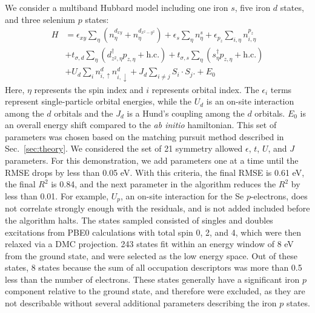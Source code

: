 We consider a multiband Hubbard model including one iron $s$, five iron $d$ states, and three selenium $p$ states:
\begin{align}
  H 
  &=
  \epsilon_{xy} \sum_{\eta} (n^{d_{xy}}_{\eta}  + n^{d_{x^2-y^2}}_{\eta})
  +
  \epsilon_s \sum_{\eta} n^{s}_{\eta} 
  +
  \epsilon_{p_{z}} \sum_{i,\eta} n^{p_{z}}_{i,\eta} 
  \nonumber \\
  &+ 
  t_{\sigma,d} \sum_{\eta} \left( d_{z^2,\eta}^{\dagger} p_{z,\eta} + \text{h.c.} \right)
  +
  t_{\sigma,s} \sum_{\eta} \left(s_{\eta}^{\dagger}  p_{z,\eta} + \text{h.c.} \right)
  \nonumber \\
  &+
  U_d \sum_{i} n^{d}_{i,\uparrow} n^{d}_{i,\downarrow} 
  +
  J_d \sum_{i\ne j} S_i \cdot S_j.
  +
  E_0 \label{eq:fesemodel}
\end{align}
Here, $\eta$ represents the spin index and $i$ represents orbital index.
The $\epsilon_i$ terms represent single-particle orbital energies, while the $U_d$ is an on-site interaction among the $d$ orbitals and the $J_d$ is a Hund's coupling among the $d$ orbitals.
$E_0$ is an overall energy shift compared to the \textit{ab initio} hamiltonian.
This set of parameters was chosen based on the matching pursuit method described in Sec.~\ref{sec:theory}.
We considered the set of 21 symmetry allowed $\epsilon$, $t$, $U$, and $J$ parameters. 
For this demonstration, we add parameters one at a time until the RMSE drops by less than 0.05 eV. 
With this criteria, the final RMSE is 0.61 eV, the final $R^2$ is 0.84, and the next parameter in the algorithm reduces the $R^2$ by less than 0.01.
For example, $U_p$, an on-site interaction for the Se $p$-electrons, does not correlate strongly enough with the residuals, and is not added included before the algorithm halts.
The states sampled consisted of singles and doubles excitations from PBE0 calculations with total spin 0, 2, and 4, which were then relaxed via a DMC projection.
243 states fit within an energy window of 8 eV from the ground state, and were selected as the low energy space.
Out of these states, 8 states because the sum of all occupation descriptors was more than 0.5 less than the number of electrons.
These states generally have a significant iron $p$ component relative to the ground state, and therefore were excluded, as they are not describable without several additional parameters describing the iron $p$ states.

